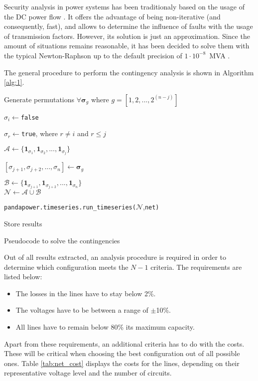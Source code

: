 Security analysis in power systems has been traditionaly based on the usage of the DC power flow \cite{stott2009dc, capitanescu2011state}. It offers the advantage of being non-iterative (and consequently, fast), and allows to determine the influence of faults with the usage of transmission factors. However, its solution is just an approximation. Since the amount of situations remains reasonable, it has been decided to solve them with the typical Newton-Raphson up to the default precision of $1\cdot 10^{-8}$~MVA \cite{pandapower2018}. 

The general procedure to perform the contingency analysis is shown in Algorithm \ref{alg:1}.

\begin{algorithm}[!htb]
\DontPrintSemicolon
  
  Generate permutations $\forall \bm{\sigma}_{g}$ where $g=[1,2,...,2^{(n-j)}]$

  {
    $\sigma_i\gets$\texttt{false}

    $\sigma_r\gets$\texttt{true}, where $r\neq i$ and $r\leq j$

    $\mathcal{A}\gets \{\mathbf{1}_{\sigma_{1}}, \mathbf{1}_{\sigma_{2}},..., \mathbf{1}_{\sigma_{j}}\}$\\

    {
      $[\sigma_{j+1}, \sigma_{j+2},..., \sigma_n] \gets \bm{\sigma}_g$

    $\mathcal{B} \gets \{\mathbf{1}_{\sigma_{j+1}}, \mathbf{1}_{\sigma_{j+2}},..., \mathbf{1}_{\sigma_{n}}\}$\\

    $\mathcal{N} \gets \mathcal{A} \cup \mathcal{B}$

    \texttt{pandapower.timeseries.run\_timeseries(}$\mathcal{N}$,\texttt{net)}

    Store results
    }
  }
\caption{Pseudocode to solve the contingencies}
\label{alg:1}
\end{algorithm}
Out of all results extracted, an analysis procedure is required in order to determine which configuration meets the $N-1$ criteria. The requirements are listed below:
\begin{itemize}
  \item The losses in the lines have to stay below 2\%.
    \vspace{-0.5cm}
    \item The voltages have to be between a range of $\pm$10\%.
      \vspace{-0.5cm}
    \item All lines have to remain below 80\% its maximum capacity.
\end{itemize}
Apart from these requirements, an additional criteria has to do with the costs. These will be critical when choosing the best configuration out of all possible ones. Table \ref{tab:net_cost} displays the costs for the lines, depending on their representative voltage level and the number of circuits.

